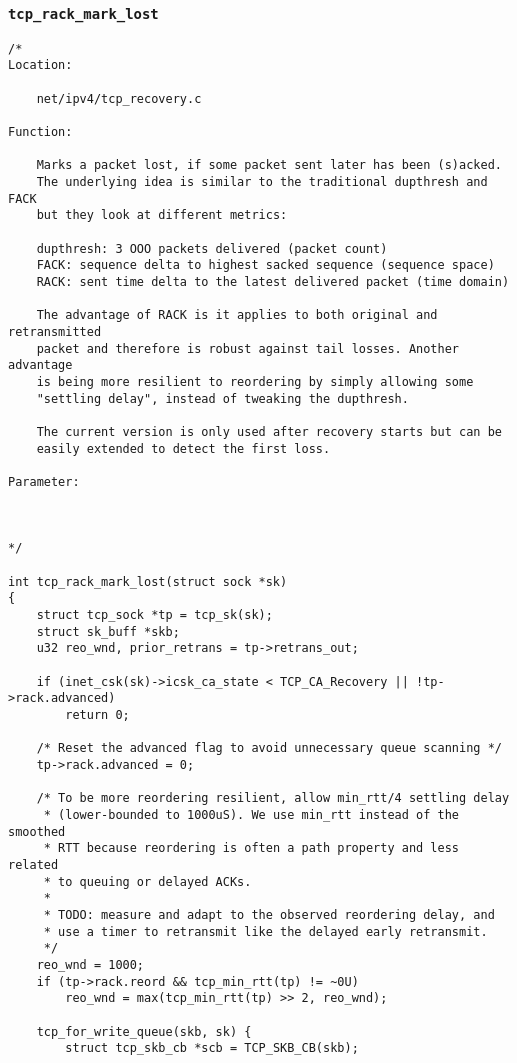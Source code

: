         \subsubsection{\texttt{tcp_rack_mark_lost}}
\begin{verbatim}
/*
Location:

    net/ipv4/tcp_recovery.c

Function:

    Marks a packet lost, if some packet sent later has been (s)acked.
    The underlying idea is similar to the traditional dupthresh and FACK
    but they look at different metrics:

    dupthresh: 3 OOO packets delivered (packet count)
    FACK: sequence delta to highest sacked sequence (sequence space)
    RACK: sent time delta to the latest delivered packet (time domain)

    The advantage of RACK is it applies to both original and retransmitted
    packet and therefore is robust against tail losses. Another advantage
    is being more resilient to reordering by simply allowing some
    "settling delay", instead of tweaking the dupthresh.

    The current version is only used after recovery starts but can be
    easily extended to detect the first loss.

Parameter:



*/

int tcp_rack_mark_lost(struct sock *sk)
{
    struct tcp_sock *tp = tcp_sk(sk);
    struct sk_buff *skb;
    u32 reo_wnd, prior_retrans = tp->retrans_out;

    if (inet_csk(sk)->icsk_ca_state < TCP_CA_Recovery || !tp->rack.advanced)
        return 0;

    /* Reset the advanced flag to avoid unnecessary queue scanning */
    tp->rack.advanced = 0;

    /* To be more reordering resilient, allow min_rtt/4 settling delay
     * (lower-bounded to 1000uS). We use min_rtt instead of the smoothed
     * RTT because reordering is often a path property and less related
     * to queuing or delayed ACKs.
     *
     * TODO: measure and adapt to the observed reordering delay, and
     * use a timer to retransmit like the delayed early retransmit.
     */
    reo_wnd = 1000;
    if (tp->rack.reord && tcp_min_rtt(tp) != ~0U)
        reo_wnd = max(tcp_min_rtt(tp) >> 2, reo_wnd);

    tcp_for_write_queue(skb, sk) {
        struct tcp_skb_cb *scb = TCP_SKB_CB(skb);


\end{verbatim}
